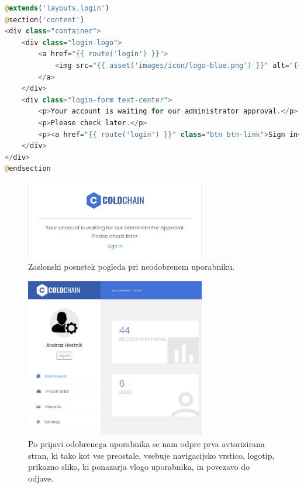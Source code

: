 \documentclass[a4paper, 12pt]{book}
\begin{document}
\begin{lstlisting}[language=PHP, style=mystyle]
@extends('layouts.login')
@section('content')
<div class="container">
    <div class="login-logo">
        <a href="{{ route('login') }}">
            <img src="{{ asset('images/icon/logo-blue.png') }}" alt="{{ config('app.name') }}">
        </a>
    </div>
    <div class="login-form text-center">
        <p>Your account is waiting for our administrator approval.</p>
        <p>Please check later.</p>
        <p><a href="{{ route('login') }}" class="btn btn-link">Sign in</a></p>
    </div>
</div>
@endsection
\end{lstlisting}


\begin{figure}[h]
\begin{center}
\includegraphics[width=0.7\textwidth]{slike/approval.png}
\end{center}
\caption{Zaslonski posnetek pogleda pri neodobrenem uporabniku.}
\label{ss-approval}
\end{figure}

\begin{figure}[h]
\begin{center}
\includegraphics[width=0.7\textwidth]{slike/logout.png}
\end{center}
\caption{Po prijavi odobrenega uporabnika se nam odpre prva avtorizirana stran, ki tako kot vse preostale, vsebuje navigacijsko vrstico, logotip, prikazno sliko, ki ponazarja vlogo uporabnika, in povezavo do odjave.}
\label{ss-logout}
\end{figure}
\end{document}
